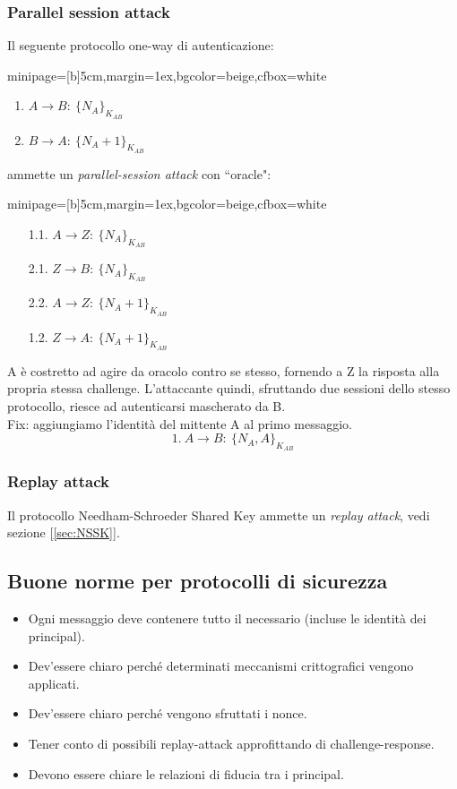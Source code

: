 \documentclass[a4paper, 11pt, notitlepage, fleqn]{report}
\newcommand{\fromto}[2]{#1\rightarrow #2\!:\ }
\newenvironment{colbox}[2]%
{%
	\par\noindent\hspace{10pt}
	\begin{adjustbox}{minipage=[b]{#2},margin=1ex,bgcolor=#1,cfbox=white}
}{%
	\end{adjustbox}\newline%
}
\begin{document}
\subsubsection{Parallel session attack}
Il seguente protocollo one-way di autenticazione:
\begin{colbox}{beige}{5cm}
	\begin{enumerate}
		\item $\fromto{A}{B}\{N_A\}_{K_{AB}}$
		\item $\fromto{B}{A}\{N_A+1\}_{K_{AB}}$
	\end{enumerate}
\end{colbox}
ammette un \emph{parallel-session attack} con ``oracle":
\begin{colbox}{beige}{5cm}
	\begin{enumerate}
		\item[1.1.] $\fromto{A}{Z}\{N_A\}_{K_{AB}}$
		\item[2.1.] $\fromto{Z}{B}\{N_A\}_{K_{AB}}$
		\item[2.2.] $\fromto{A}{Z}\{N_A+1\}_{K_{AB}}$
		\item[1.2.] $\fromto{Z}{A}\{N_A+1\}_{K_{AB}}$
	\end{enumerate}
\end{colbox}
A è costretto ad agire da oracolo contro se stesso, fornendo a Z la risposta alla propria stessa challenge. L'attaccante quindi, sfruttando due sessioni dello stesso protocollo, riesce ad autenticarsi mascherato da B.\\
Fix: aggiungiamo l'identità del mittente A al primo messaggio.
\begin{equation*}
	1.\ \fromto{A}{B}\{N_A,A\}_{K_{AB}}
\end{equation*}

\subsubsection{Replay attack}
Il protocollo Needham-Schroeder Shared Key ammette un \emph{replay attack}, vedi sezione [\ref{sec:NSSK}].

\subsection{Buone norme per protocolli di sicurezza}
\begin{itemize}
	\item Ogni messaggio deve contenere tutto il necessario (incluse le identità dei principal).
	\item Dev'essere chiaro perché determinati meccanismi crittografici vengono applicati.
	\item Dev'essere chiaro perché vengono sfruttati i nonce.
	\item Tener conto di possibili replay-attack approfittando di challenge-response.
	\item Devono essere chiare le relazioni di fiducia tra i principal.
\end{itemize}
\end{document}
